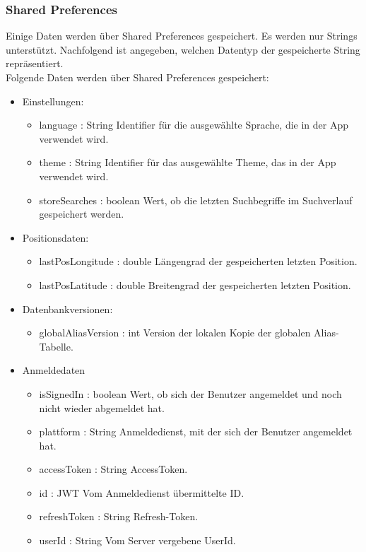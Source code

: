 \subsubsection{Shared Preferences}
Einige Daten werden über Shared Preferences gespeichert. Es werden nur Strings unterstützt. 
Nachfolgend ist angegeben, welchen Datentyp der gespeicherte String repräsentiert.\\
Folgende Daten werden über Shared Preferences gespeichert:

\begin{itemize}
    \item Einstellungen: 
    \begin{itemize}
        \item language : String Identifier für die ausgewählte Sprache, die in der App verwendet wird.
        \item theme : String Identifier für das ausgewählte Theme, das in der App verwendet wird.
        \item storeSearches : boolean Wert, ob die letzten Suchbegriffe im Suchverlauf gespeichert werden.
    \end{itemize}
    \item Positionsdaten:
    \begin{itemize}
        \item lastPosLongitude : double Längengrad der gespeicherten letzten Position.
        \item lastPosLatitude : double Breitengrad der gespeicherten letzten Position.
    \end{itemize}
    \item Datenbankversionen:
    \begin{itemize}
        \item globalAliasVersion : int Version der lokalen Kopie der globalen Alias-Tabelle.
    \end{itemize}
    \item Anmeldedaten
    \begin{itemize}
        \item isSignedIn : boolean Wert, ob sich der Benutzer angemeldet und noch nicht wieder abgemeldet hat.
        \item plattform : String Anmeldedienst, mit der sich der Benutzer angemeldet hat.
        \item accessToken : String AccessToken.
        \item id : JWT Vom Anmeldedienst übermittelte ID.
        \item refreshToken : String Refresh-Token.
        \item userId : String Vom Server vergebene UserId.
    \end{itemize}
\end{itemize}
